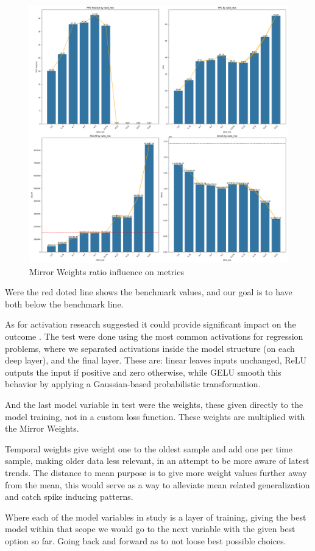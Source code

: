 \begin{figure}[H]
    \centering
    \includegraphics[width=\textwidth]{plots/article_ratio_mw.png}
    \caption{Mirror Weights ratio influence on metrics}
    \label{fig:Ratio_influence_on_metrics}
  \end{figure}
Were the red doted line shows the benchmark values, and our goal is to have both below the benchmark line.\par
As for activation research suggested it could  provide significant impact on the outcome \cite{Vaswani2017,Liu2022}. The test were done using the most common activations for regression problems, where we separated activations inside the model structure (on each deep layer), and the final layer. These are: linear leaves inputs unchanged, \gls{ReLU} outputs the input if positive and zero otherwise, while \gls{GELU} smooth this behavior by applying a Gaussian-based probabilistic transformation. \par
And the last model variable in test were the weights, these given directly to the model training, not in a custom loss function. These weights are multiplied with the Mirror Weights.\par
Temporal weights give weight one to the oldest sample and add one per time sample, making older data less relevant, in an attempt to be more aware of latest trends. The distance to mean purpose is to give more weight values further away from the mean, this would serve as a way to alleviate mean related generalization and catch spike inducing patterns.\par
Where each of the model variables in study is a layer of training, giving the best model within that scope we would go to the next variable with the given best option so far. Going back and forward as to not loose best possible choices.\par


